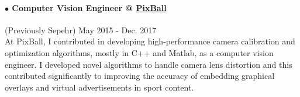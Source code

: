 \documentclass[10pt]{res}
\begin{document}
\begin{resume}
\paragraph{$\bullet$ Computer Vision Engineer @ \href{http://pixballsports.com}{PixBall}} (Previously Sepehr) \hfill May 2015 - Dec. 2017\\
At PixBall, I contributed in developing high-performance camera calibration and optimization algorithms, mostly in C++ and Matlab, as a computer vision engineer. 
I developed novel algorithms to handle camera lens distortion and this contributed significantly to improving the accuracy of embedding graphical overlays and virtual advertisements in sport content.
\vspace{-12pt}





\end{resume}
\end{document}
